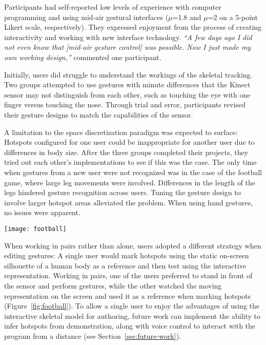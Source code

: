 Participants had self-reported low levels of experience with computer programming and using mid-air gestural interfaces ($\mu$=1.8 and $\mu$=2 on a 5-point Likert scale, respectively). They expressed enjoyment from the process of creating interactivity and working with new interface technology. \emph{“A few days ago I did not even know that [mid-air gesture control] was possible. Now I just made my own working design,”} commented one participant.

Initially, users did struggle to understand the workings of the skeletal tracking. Two groups attempted to use gestures with minute differences that the Kinect sensor may not distinguish from each other, such as touching the eye with one finger versus touching the nose. Through trial and error, participants revised their gesture designs to match the capabilities of the sensor.

A limitation to the space discretization paradigm was expected to surface: Hotspots configured for one user could be inappropriate for another user due to differences in body size. After the three groups completed their projects, they tried out each other’s implementations to see if this was the case. The only time when gestures from a new user were not recognized was in the case of the football game, where large leg movements were involved. Differences in the length of the legs hindered gesture recognition across users. Tuning the gesture design to involve larger hotspot areas alleviated the problem. When using hand gestures, no issues were apparent.

\begin{SCfigure}[\sidecaptionrelwidth][ht]
\centering
\texttt{[image: football]}
\caption{User strategies included working in pairs. One user performs gestures in front of the sensor while the other marks hotspots that correspond to limb positions.}
\label{fig:football}
\end{SCfigure}

When working in pairs rather than alone, users adopted a different strategy when editing gestures: A single user would mark hotspots using the static on-screen silhouette of a human body as a reference and then test using the interactive representation. Working in pairs, one of the users preferred to stand in front of the sensor and perform gestures, while the other watched the moving representation on the screen and used it as a reference when marking hotspots (Figure~\ref{fig:football}). To allow a single user to enjoy the advantages of using the interactive skeletal model for authoring, future work can implement the ability to infer hotspots from demonstration, along with voice control to interact with the program from a distance (see Section~\ref{sec:future-work}).

